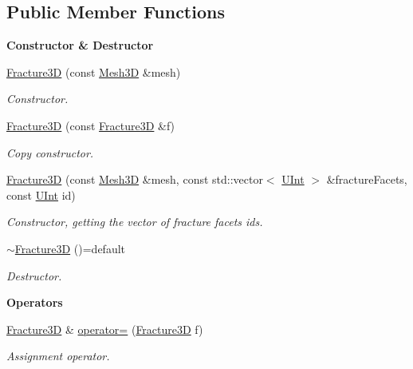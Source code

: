 \subsection*{Public Member Functions}
\begin{Indent}{\bf Constructor \& Destructor}\par
\begin{DoxyCompactItemize}
\item 
\hyperlink{classFVCode3D_1_1Fracture3D_a71eac02a97fa86896ae0a779fa581d03}{Fracture3D} (const \hyperlink{classFVCode3D_1_1Mesh3D}{Mesh3D} \&mesh)
\begin{DoxyCompactList}\small\item\em Constructor. \end{DoxyCompactList}\item 
\hyperlink{classFVCode3D_1_1Fracture3D_a4babeb6bfab2f22db8e33ff510d57d6b}{Fracture3D} (const \hyperlink{classFVCode3D_1_1Fracture3D}{Fracture3D} \&f)
\begin{DoxyCompactList}\small\item\em Copy constructor. \end{DoxyCompactList}\item 
\hyperlink{classFVCode3D_1_1Fracture3D_a998dc24389a5b6c6776b9e7a05db0b61}{Fracture3D} (const \hyperlink{classFVCode3D_1_1Mesh3D}{Mesh3D} \&mesh, const std\+::vector$<$ \hyperlink{namespaceFVCode3D_a4bf7e328c75d0fd504050d040ebe9eda}{U\+Int} $>$ \&fracture\+Facets, const \hyperlink{namespaceFVCode3D_a4bf7e328c75d0fd504050d040ebe9eda}{U\+Int} id)
\begin{DoxyCompactList}\small\item\em Constructor, getting the vector of fracture facets ids. \end{DoxyCompactList}\item 
\hyperlink{classFVCode3D_1_1Fracture3D_ab485e2197b87c25de7f8d42db04a3b95}{$\sim$\+Fracture3D} ()=default
\begin{DoxyCompactList}\small\item\em Destructor. \end{DoxyCompactList}\end{DoxyCompactItemize}
\end{Indent}
\begin{Indent}{\bf Operators}\par
\begin{DoxyCompactItemize}
\item 
\hyperlink{classFVCode3D_1_1Fracture3D}{Fracture3D} \& \hyperlink{classFVCode3D_1_1Fracture3D_ab3dae8603c747c67b0483e01b863a89e}{operator=} (\hyperlink{classFVCode3D_1_1Fracture3D}{Fracture3D} f)
\begin{DoxyCompactList}\small\item\em Assignment operator. \end{DoxyCompactList}\end{DoxyCompactItemize}
\end{Indent}
